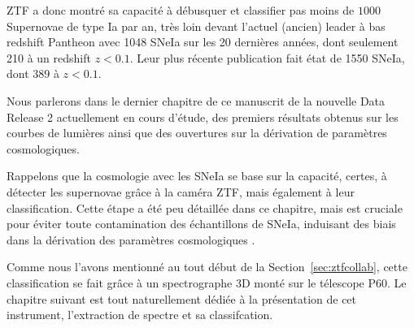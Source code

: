 \documentclass[../main/main.tex]{subfiles}
\begin{document}
ZTF a donc montré sa capacité à débusquer et classifier pas moins de
$1000$ Supernovae de type Ia par an, très loin devant l'actuel (ancien)
leader à bas redshift Pantheon \citep{Scolnicpantheon18} avec 1048 SNeIa
sur les 20 dernières années, dont seulement 210 à un redshift
$z<0.1$. Leur plus récente publication
\citep[Pantheon+,][]{Scolnicpantheon21} fait état de 1550 SNeIa, dont 389 à $z<0.1$.

Nous parlerons dans le dernier chapitre de ce manuscrit de la nouvelle
Data Release 2 actuellement en cours d'étude, des premiers résultats obtenus sur les courbes de
lumières ainsi que des ouvertures sur la dérivation de paramètres
cosmologiques.

Rappelons que la cosmologie avec les SNeIa se base sur la capacité, certes, à
détecter les supernovae grâce à la caméra ZTF, mais également à leur
classification. Cette étape a été peu détaillée dans ce chapitre, mais
est cruciale pour éviter toute contamination des échantillons de SNeIa,
induisant des biais dans la dérivation des paramètres cosmologiques
\citep{JonesScolnic17SNcontam}.

Comme nous l'avons mentionné au tout
début de la Section~\ref{sec:ztfcollab}, cette classification se fait
grâce à un spectrographe 3D monté sur le télescope P60. Le chapitre
suivant est tout naturellement dédiée à la présentation de cet
instrument, l'extraction de spectre et sa classifcation.




\end{document}
